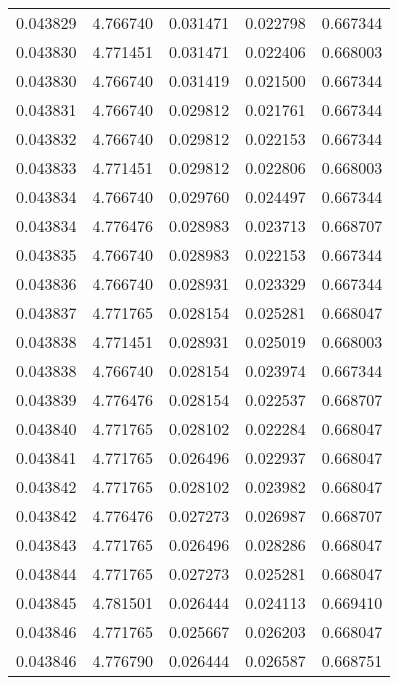 \begin{tabular}{lrrrr}
0.043829    &  4.766740 &  0.031471 &  0.022798 &             0.667344 \\
0.043830    &  4.771451 &  0.031471 &  0.022406 &             0.668003 \\
0.043830    &  4.766740 &  0.031419 &  0.021500 &             0.667344 \\
0.043831    &  4.766740 &  0.029812 &  0.021761 &             0.667344 \\
0.043832    &  4.766740 &  0.029812 &  0.022153 &             0.667344 \\
0.043833    &  4.771451 &  0.029812 &  0.022806 &             0.668003 \\
0.043834    &  4.766740 &  0.029760 &  0.024497 &             0.667344 \\
0.043834    &  4.776476 &  0.028983 &  0.023713 &             0.668707 \\
0.043835    &  4.766740 &  0.028983 &  0.022153 &             0.667344 \\
0.043836    &  4.766740 &  0.028931 &  0.023329 &             0.667344 \\
0.043837    &  4.771765 &  0.028154 &  0.025281 &             0.668047 \\
0.043838    &  4.771451 &  0.028931 &  0.025019 &             0.668003 \\
0.043838    &  4.766740 &  0.028154 &  0.023974 &             0.667344 \\
0.043839    &  4.776476 &  0.028154 &  0.022537 &             0.668707 \\
0.043840    &  4.771765 &  0.028102 &  0.022284 &             0.668047 \\
0.043841    &  4.771765 &  0.026496 &  0.022937 &             0.668047 \\
0.043842    &  4.771765 &  0.028102 &  0.023982 &             0.668047 \\
0.043842    &  4.776476 &  0.027273 &  0.026987 &             0.668707 \\
0.043843    &  4.771765 &  0.026496 &  0.028286 &             0.668047 \\
0.043844    &  4.771765 &  0.027273 &  0.025281 &             0.668047 \\
0.043845    &  4.781501 &  0.026444 &  0.024113 &             0.669410 \\
0.043846    &  4.771765 &  0.025667 &  0.026203 &             0.668047 \\
0.043846    &  4.776790 &  0.026444 &  0.026587 &             0.668751 \\

\end{tabular}
